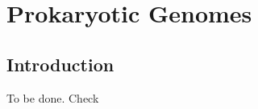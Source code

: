 \chapter{Prokaryotic Genomes}\label{chp:prokaryotic_genomes}

\minitoc

\section{Introduction}
To be done. Check  \cite{He2024}